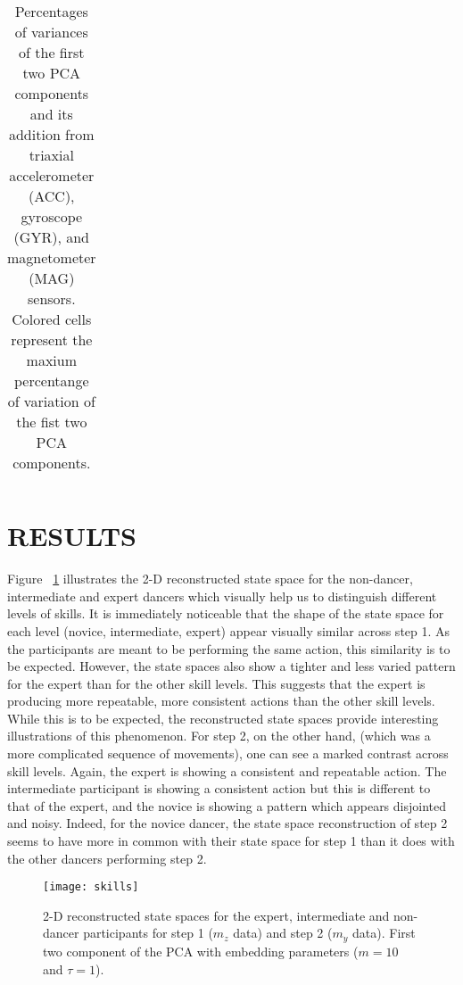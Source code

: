 \documentclass{sigchi}
\begin{document}
\begin{table}
\begin{tabular}{l c c c c c c }
\bottomrule
\end{tabular}

  \caption{Percentages of variances of the first two PCA components and its addition
       from triaxial accelerometer (ACC), gyroscope (GYR), and magnetometer (MAG) sensors.
  Colored cells represent the maxium percentange of variation of the fist two PCA components.}
  \label{tab:table2}
\end{table}


\section{RESULTS}
Figure ~\ref{fig:skills} illustrates the 2-D reconstructed state space for the 
non-dancer, intermediate and expert dancers which visually help us to distinguish different levels of skills. 
It is immediately noticeable that the shape of the state space for each level (novice, intermediate, expert) 
appear visually similar across step 1.  
As the participants are meant to be performing the same action, this similarity is to be expected.  
However, the state spaces also show a tighter and less varied pattern for the expert than for the other skill levels.  
This suggests that the expert is producing more repeatable, more consistent actions than the other skill levels.  
While this is to be expected, the reconstructed state spaces provide interesting illustrations of this phenomenon.  
For step 2, on the other hand, (which was a more complicated sequence of movements),
one can see a marked contrast across skill levels.  
Again, the expert is showing a consistent and repeatable action.  
The intermediate participant is showing a consistent action but this is different to that of the expert, 
and the novice is showing a pattern which appears disjointed and noisy.  
Indeed, for the novice dancer, the state space reconstruction of step 2 seems to have more in common 
with their state space for step 1 than it does with the other dancers performing step 2.  
\begin{figure}[!h]
  \centering    
  \texttt{[image: skills]}
  \caption[PA]{2-D reconstructed state spaces for the expert, intermediate and 
  non-dancer participants for step 1 ($m_z$ data) and step 2 ($m_y$ data). 
  First two component of the PCA with embedding parameters ($m = 10$ and $\tau = 1$).}
  \label{fig:skills}
  \end{figure}
\end{document}
